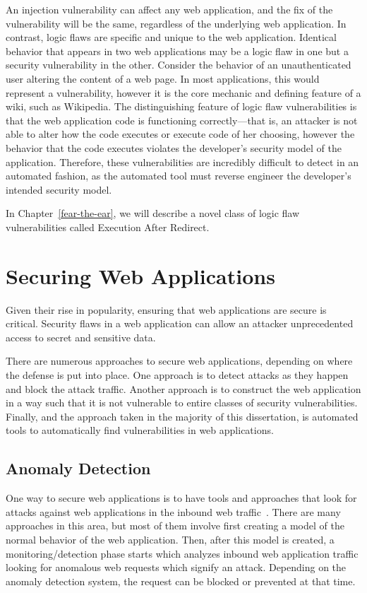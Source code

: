 An injection vulnerability can affect any web application, and the fix
of the vulnerability will be the same, regardless of the underlying
web application. In contrast, logic flaws are specific and unique to
the web application. Identical behavior that appears in two web
applications may be a logic flaw in one but a security vulnerability
in the other. Consider the behavior of an unauthenticated user
altering the content of a web page. In most applications, this would
represent a vulnerability, however it is the core mechanic and
defining feature of a wiki, such as Wikipedia. The distinguishing
feature of logic flaw vulnerabilities is that the web application code
is functioning correctly---that is, an attacker is not able to alter
how the code executes or execute code of her choosing, however the
behavior that the code executes violates the developer's security
model of the application. Therefore, these vulnerabilities are
incredibly difficult to detect in an automated fashion, as the
automated tool must reverse engineer the developer's intended security
model.

In Chapter~\ref{fear-the-ear}, we will describe a novel class of logic
flaw vulnerabilities called Execution After Redirect.

\section{Securing Web Applications}

Given their rise in popularity, ensuring that web applications are
secure is critical. Security flaws in a web application can allow an
attacker unprecedented access to secret and sensitive data. 

There are numerous approaches to secure web applications, depending on
where the defense is put into place. One approach is to detect attacks as they
happen and block the attack traffic. Another approach is to construct
the web application in a way such that it is not vulnerable to entire
classes of security vulnerabilities. Finally, and the approach taken
in the majority of this dissertation, is automated tools to
automatically find vulnerabilities in web applications.


\subsection{Anomaly Detection}

One way to secure web applications is to have tools and approaches
that look for attacks against web applications in the inbound web
traffic~\cite{robertson09:dissertation}. There are many approaches in
this area, but most of them involve first creating a model of the
normal behavior of the web application. Then, after this model is
created, a monitoring/detection phase starts which analyzes inbound
web application traffic looking for anomalous web requests which signify
an attack. Depending on the anomaly detection system, the request can
be blocked or prevented at that time.

